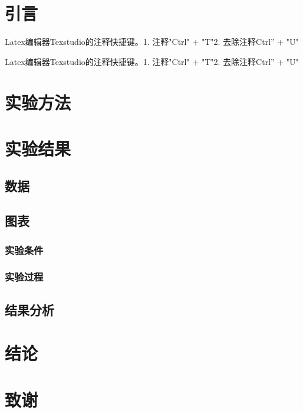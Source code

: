 \documentclass{article}
\begin{document}
	\section{引言}
	Latex编辑器Texstudio的注释快捷键。1. 注释"Ctrl" + "T"2. 去除注释Ctrl” + "U"
	
	Latex编辑器Texstudio的注释快捷键。1. 注释"Ctrl" + "T"2. 去除注释Ctrl” + "U"
	\section{实验方法}
	\section{实验结果}
	\subsection{数据}
	\subsection{图表}
	\subsubsection{实验条件}
	\subsubsection{实验过程}
	\subsection{结果分析}
	\section{结论}
	\section{致谢}
	
	
	
	
\end{document}
